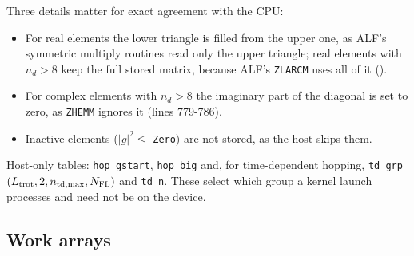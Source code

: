 Three details matter for exact agreement with the CPU:
\begin{itemize}
\item For real elements the lower triangle is filled from the upper one, as ALF's symmetric multiply routines read only the upper triangle; real elements with $n_d>8$ keep the full stored matrix, because ALF's \texttt{ZLARCM} uses all of it ().
\item For complex elements with $n_d>8$ the imaginary part of the diagonal is set to zero, as \texttt{ZHEMM} ignores it (lines 779-786).
\item Inactive elements ($|g|^2\le$ \texttt{Zero}) are not stored, as the host skips them.
\end{itemize}
Host-only tables: \texttt{hop\_gstart}, \texttt{hop\_big} and, for time-dependent hopping, \texttt{td\_grp}$(L_{\rm trot},2,n_{\rm td,max},N_{\rm FL})$ and \texttt{td\_n}. These select which group a kernel launch processes and need not be on the device.


\subsection{Work arrays}

